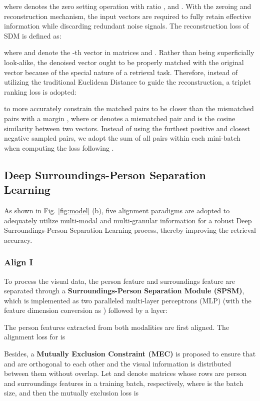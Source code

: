 \documentclass[sigconf]{acmart}
\begin{document}
where  denotes the zero setting operation with ratio ,  and . With the zeroing and reconstruction mechanism, the input vectors are required to fully retain effective information while discarding redundant noise signals. The reconstruction loss of SDM is defined as:

where  and  denote the -th vector in matrices  and . Rather than being superficially look-alike, the denoised vector ought to be properly matched with the original vector because of the special nature of a retrieval task. Therefore, instead of utilizing the traditional Euclidean Distance to guide the reconstruction, a triplet ranking loss is adopted:

to more accurately constrain the matched pairs to be closer than the mismatched pairs with a margin , where  or  denotes a mismatched pair and  is the cosine similarity between two vectors. Instead of using the furthest positive and closest negative sampled pairs, we adopt the sum of all pairs within each mini-batch when computing the loss following \cite{faghri2017vse++}.

\subsection{Deep Surroundings-Person Separation Learning}
\label{sec:feature_alignment}
As shown in Fig. \ref{fig:model} (b), five alignment paradigms are adopted to adequately utilize multi-modal and multi-granular information for a robust Deep Surroundings-Person Separation Learning process, thereby improving the retrieval accuracy.
\subsubsection{Align I}
To process the visual data, the person feature  and surroundings feature  are separated through a \textbf{Surroundings-Person Separation Module (SPSM)}, which is implemented as two paralleled multi-layer perceptrons (MLP) (with the feature dimension conversion as ) followed by a  layer:

The person features extracted from both modalities are first aligned. The alignment loss for  is

Besides, a \textbf{Mutually Exclusion Constraint (MEC)} is proposed to ensure that  and  are orthogonal to each other and the visual information is distributed between them without overlap. Let  and  denote matrices whose rows are person and surroundings features in a training batch, respectively, where  is the batch size, and then the mutually exclusion loss is
\end{document}
